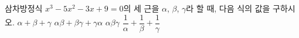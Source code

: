 삼차방정식 $x^3-5x^2-3x+9=0$의 세 근을 $\alpha$, $\beta$, $\gamma$라 할 때, 다음 식의 값을 구하시오.
 $\alpha+\beta+\gamma$
 $\alpha\beta+\beta\gamma+\gamma\alpha$
 $\alpha\beta\gamma$
 $\dfrac{1}{\alpha}+\dfrac{1}{\beta}+\dfrac{1}{\gamma}$
